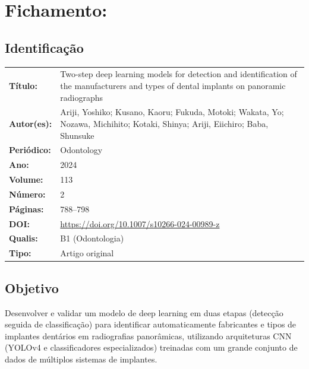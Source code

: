 \section{Fichamento: }

\subsection{Identificação}
\begin{tabular}{ll}
\textbf{Título:} & Two-step deep learning models for detection and
identification of the manufacturers and types of dental implants on
panoramic radiographs \\
\textbf{Autor(es):} & Ariji, Yoshiko; Kusano, Kaoru; Fukuda, Motoki;
Wakata, Yo; Nozawa, Michihito; Kotaki, Shinya; Ariji, Eiichiro;
Baba, Shunsuke \\
\textbf{Periódico:} & Odontology \\
\textbf{Ano:} & 2024 \\
\textbf{Volume:} & 113 \\
\textbf{Número:} & 2 \\
\textbf{Páginas:} & 788--798 \\
\textbf{DOI:} & \url{https://doi.org/10.1007/s10266-024-00989-z} \\
\textbf{Qualis:} & B1 (Odontologia) \\
\textbf{Tipo:} & Artigo original \\
\end{tabular}

\subsection{Objetivo}
Desenvolver e validar um modelo de deep learning em duas etapas (detecção
seguida de classificação) para identificar automaticamente fabricantes e
tipos de implantes dentários em radiografias panorâmicas, utilizando
arquiteturas CNN (YOLOv4 e classificadores especializados) treinadas com
um grande conjunto de dados de múltiplos sistemas de implantes.

